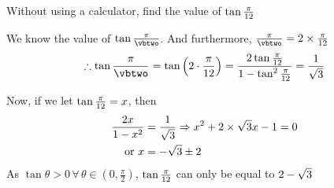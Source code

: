 


\DIVIDE{}\vbtwo

\question[3] Without using a calculator, find the value of $\tan\frac{\pi}{12}$

\watchout

\ifprintanswers
\fi 

\begin{solution}[\halfpage]
  We know the value of $\tan\frac\pi\vbtwo$. And furthermore, $\frac\pi\vbtwo = 2\times\frac\pi\vbone$
	\begin{align}
		\therefore\tan\frac{\pi}{\vbtwo} = \tan \left(2\cdot\frac{\pi}{\vbone}\right) &= \frac{2\tan\frac{\pi}{\vbone}}{1-\tan^2\frac{\pi}{\vbone}} = \vbthree \\
  \end{align}

  Now, if we let $\tan\frac\pi{12} = x$, then 
  \begin{align}
    \dfrac{2x}{1-x^2} &= \dfrac{1}{\sqrt{3}} \Rightarrow
		x^2 + 2\times\sqrt{3} x - 1 = 0 \\
    \text{ or } x &= -\sqrt{3} \pm 2 
	\end{align}
	As $\tan\theta > 0 \,\forall \,\theta \in (0,\frac{\pi}{2})$, $\tan\frac\pi{12}$ can only be equal to
	$2 - \sqrt{3}$
\end{solution}
